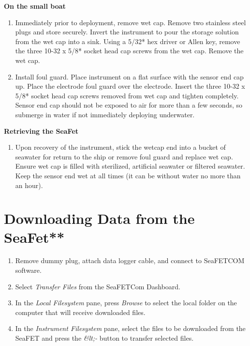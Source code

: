 \documentclass[]{book}
\providecommand{\tightlist}{%
  \setlength{\itemsep}{0pt}\setlength{\parskip}{0pt}}
\begin{document}
\textbf{On the small boat}

\begin{enumerate}
\def\labelenumi{\arabic{enumi}.}
\tightlist
\item
  Immediately prior to deployment, remove wet cap. Remove two stainless steel plugs and store securely. Invert the instrument to pour the storage solution from the wet cap into a sink. Using a 5/32* hex driver or Allen key, remove the three 10-32 x 5/8* socket head cap screws from the wet cap. Remove the wet cap.
\item
  Install foul guard. Place instrument on a flat surface with the sensor end cap up. Place the electrode foul guard over the electrode. Insert the three 10-32 x 5/8* socket head cap screws removed from wet cap and tighten completely. Sensor end cap should not be exposed to air for more than a few seconds, so submerge in water if not immediately deploying underwater.
\end{enumerate}

\textbf{Retrieving the SeaFet}

\begin{enumerate}
\def\labelenumi{\arabic{enumi}.}
\tightlist
\item
  Upon recovery of the instrument, stick the wetcap end into a bucket of seawater for return to the ship or remove foul guard and replace wet cap. Ensure wet cap is filled with sterilized, artificial seawater or filtered seawater. Keep the sensor end wet at all times (it can be without water no more than an hour).
\end{enumerate}

\hypertarget{downloading-data-from-the-seafet}{%
\section{Downloading Data from the SeaFet**}\label{downloading-data-from-the-seafet}}

\begin{enumerate}
\def\labelenumi{\arabic{enumi}.}
\setcounter{enumi}{1}
\item
  Remove dummy plug, attach data logger cable, and connect to SeaFETCOM software.
\item
  Select \emph{Transfer Files} from the SeaFETCom Dashboard.
\item
  In the \emph{Local Filesystem} pane, press \emph{Browse} to select the local folder on the computer that will receive downloaded files.
\item
  In the \emph{Instrument Filesystem} pane, select the files to be downloaded from the SeaFET and press the \emph{\&lt;-} button to transfer selected files.
\end{enumerate}
\end{document}
